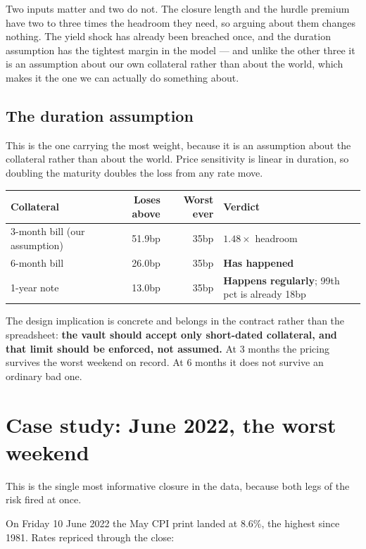 \documentclass[11pt,a4paper]{article}
\begin{document}
Two inputs matter and two do not. The closure length and the hurdle premium have two to
three times the headroom they need, so arguing about them changes nothing. The yield shock
has already been breached once, and the duration assumption has the tightest margin in the
model — and unlike the other three it is an assumption about our own collateral rather
than about the world, which makes it the one we can actually do something about.

\subsection{The duration assumption}

This is the one carrying the most weight, because it is an assumption about the collateral
rather than about the world. Price sensitivity is linear in duration, so doubling the
maturity doubles the loss from any rate move.

\begin{center}
\small
\begin{tabular}{@{}p{4.6cm}rrp{4.4cm}@{}}
\toprule
\textbf{Collateral} & \textbf{Loses above} & \textbf{Worst ever} & \textbf{Verdict} \\
\midrule
3-month bill (our assumption) & 51.9bp & 35bp & $1.48\times$ headroom \\
6-month bill & 26.0bp & 35bp & \textbf{Has happened} \\
1-year note & 13.0bp & 35bp & \textbf{Happens regularly}; 99th pct is already 18bp \\
\bottomrule
\end{tabular}
\end{center}

The design implication is concrete and belongs in the contract rather than the
spreadsheet: \textbf{the vault should accept only short-dated collateral, and that limit
should be enforced, not assumed.} At 3 months the pricing survives the worst weekend on
record. At 6 months it does not survive an ordinary bad one.

\section{Case study: June 2022, the worst weekend}

This is the single most informative closure in the data, because both legs of the risk
fired at once.

On Friday 10 June 2022 the May CPI print landed at 8.6\%, the highest since 1981. Rates
repriced through the close:
\end{document}
